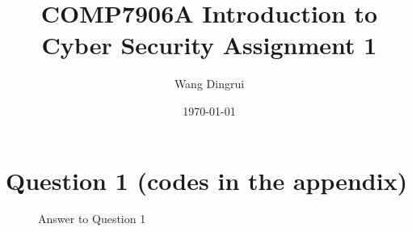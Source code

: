 \documentclass{article}
\title{COMP7906A Introduction to Cyber Security Assignment 1}
\author{Wang Dingrui}
\date{\today}
\begin{document}
\maketitle

\section{Question 1 (codes in the appendix)}


\begin{figure}[H]
    \caption{Answer to Question 1}
    \label{fig:q1handwriting}
\end{figure}
\end{document}
